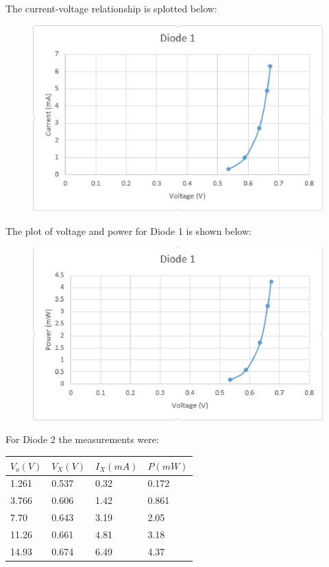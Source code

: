\documentclass[twocolumn, amsmath]{revtex4}
\begin{document}
The current-voltage relationship is splotted below:
\vspace{.8cm}	
\begin{figure}[h]  
\includegraphics[scale = 0.4]{Diode1.eps}  
\end{figure}
The plot of voltage and power for Diode 1 is shown below:

\begin{figure}[h]  

\includegraphics[scale = 0.4]{powerdiode1.eps}  
\end{figure}

For Diode 2 the measurements were:

\begin{center}
    \begin{tabular}{| l | l | l | l |}
    \hline
    $V_{o} (V)$ & $V_{X} (V)$  & $I_{X} (mA)$ & $P (mW)$ \\ \hline
    
    1.261	& 0.537  	& 0.32  & 0.172	 \\ \hline
    3.766	& 0.606  	& 1.42 	& 0.861	\\ \hline
    7.70	& 0.643  	& 3.19	& 2.05	\\ \hline
    11.26    	& 0.661  	& 4.81  & 3.18	 \\ \hline
    14.93   	& 0.674    	& 6.49  & 4.37	 	\\ 
    \hline
    \end{tabular}
\end{center}
\end{document}
